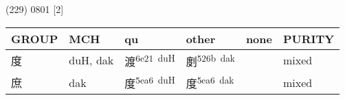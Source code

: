 \documentclass[14pt,a4paper]{scrartcl}
\begin{document}
(229) 0801 {[}2{]}

\begin{longtable}[c]{@{}llllll@{}}
\toprule
\begin{minipage}[b]{0.14\columnwidth}\raggedright\strut
GROUP
\strut\end{minipage} &
\begin{minipage}[b]{0.14\columnwidth}\raggedright\strut
MCH
\strut\end{minipage} &
\begin{minipage}[b]{0.14\columnwidth}\raggedright\strut
qu
\strut\end{minipage} &
\begin{minipage}[b]{0.14\columnwidth}\raggedright\strut
other
\strut\end{minipage} &
\begin{minipage}[b]{0.14\columnwidth}\raggedright\strut
none
\strut\end{minipage} &
\begin{minipage}[b]{0.14\columnwidth}\raggedright\strut
PURITY
\strut\end{minipage}\tabularnewline
\midrule
\endhead
\begin{minipage}[t]{0.14\columnwidth}\raggedright\strut
度
\strut\end{minipage} &
\begin{minipage}[t]{0.14\columnwidth}\raggedright\strut
duH, dak
\strut\end{minipage} &
\begin{minipage}[t]{0.14\columnwidth}\raggedright\strut
渡\textsuperscript{6e21~duH}
\strut\end{minipage} &
\begin{minipage}[t]{0.14\columnwidth}\raggedright\strut
剫\textsuperscript{526b~dak}
\strut\end{minipage} &
\begin{minipage}[t]{0.14\columnwidth}\raggedright\strut
\strut\end{minipage} &
\begin{minipage}[t]{0.14\columnwidth}\raggedright\strut
mixed
\strut\end{minipage}\tabularnewline
\begin{minipage}[t]{0.14\columnwidth}\raggedright\strut
庶
\strut\end{minipage} &
\begin{minipage}[t]{0.14\columnwidth}\raggedright\strut
dak
\strut\end{minipage} &
\begin{minipage}[t]{0.14\columnwidth}\raggedright\strut
度\textsuperscript{5ea6~duH}
\strut\end{minipage} &
\begin{minipage}[t]{0.14\columnwidth}\raggedright\strut
度\textsuperscript{5ea6~dak}
\strut\end{minipage} &
\begin{minipage}[t]{0.14\columnwidth}\raggedright\strut
\strut\end{minipage} &
\begin{minipage}[t]{0.14\columnwidth}\raggedright\strut
mixed
\strut\end{minipage}\tabularnewline
\bottomrule
\end{longtable}
\end{document}
